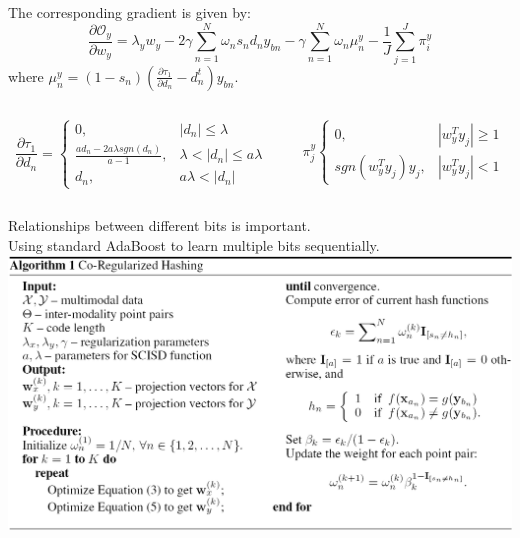 \documentclass{beamer}
\begin{document}
\begin{CJK*}{UTF8}{gbsn}
\begin{frame}[allowframebreaks]
The corresponding gradient is given by:
\begin{displaymath}
\frac{\partial\mathcal{O}_y}{\partial w_y}=\lambda_yw_y-2\gamma\sum_{n=1}^N\omega_ns_nd_ny_{bn}-\gamma\sum_{n=1}^N\omega_n\mu_n^y-\frac{1}{J}\sum_{j=1}^J\pi_i^y
\end{displaymath}
where $\mu_n^y=(1-s_n)(\frac{\partial\tau_1}{\partial d_n}-d_n^t)y_{bn}$.
\begin{columns}
\begin{column}{0.59\textwidth}
\begin{displaymath}
\frac{\partial\tau_1}{\partial d_n}=
\begin{cases}
0,& |d_n|\leq\lambda \\
\frac{ad_n-2a\lambda sgn(d_n)}{a-1},& \lambda<|d_n|\leq a\lambda \\
d_n,& a\lambda<|d_n|
\end{cases}
\end{displaymath}
\end{column}
\begin{column}{0.42\textwidth}
\begin{displaymath}
\pi_j^y
\begin{cases}
0,& |w_y^Ty_j|\geq 1 \\
sgn(w_y^Ty_j)y_j,& |w_y^Ty_j|<1
\end{cases}
\end{displaymath}
\end{column}
\end{columns}

\newpage
Relationships between different bits is important.\\
Using standard AdaBoost to learn multiple bits sequentially.
\centering
\includegraphics[scale=0.33]{images/algorithm}
\end{frame}


\end{CJK*}
\end{document}
